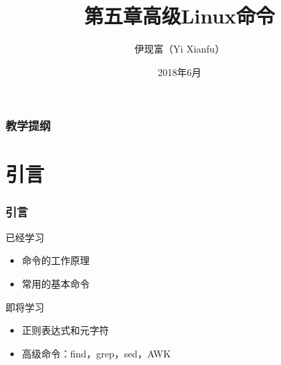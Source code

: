 



\title[高级Linux命令]{第五章\quad 高级Linux命令}
\author[Yixf]{伊现富（Yi Xianfu）}
\date{2018年6月}


\begin{frame}
  \titlepage
\end{frame}

\begin{frame}[plain,label=current]
  \frametitle{教学提纲}
  \setcounter{tocdepth}{3}
  \begin{multicols}{2}
    \tableofcontents
  \end{multicols}
\end{frame}


\section{引言}
\begin{frame}
  \frametitle{引言}
  \begin{block}{已经学习}
    \begin{itemize}
      \item 命令的工作原理
      \item 常用的基本命令
    \end{itemize}
  \end{block}
  \pause
  \begin{block}{即将学习}
    \begin{itemize}
      \item 正则表达式和元字符
      \item 高级命令：find，grep，sed，AWK
    \end{itemize}
  \end{block}
\end{frame}

